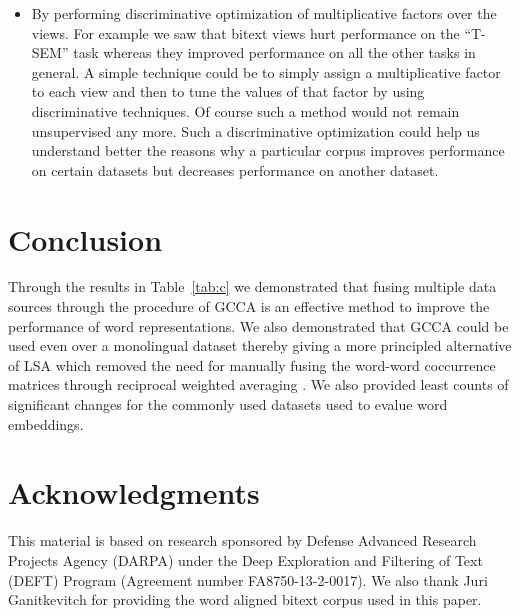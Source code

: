 \documentclass[11pt]{article}
\begin{document}
\begin{itemize}[leftmargin=*]
\item By performing discriminative optimization of multiplicative
  factors over the views. For example we saw that bitext views hurt
  performance on the ``T-SEM'' task whereas they improved performance
  on all the other tasks in general. A simple technique could be to
  simply assign a multiplicative factor to each view and 
  then to tune the values of that factor by using discriminative
  techniques. Of course such a method would not remain unsupervised any
  more. Such a discriminative optimization could help us understand
  better the reasons why a particular corpus improves performance on
  certain datasets but decreases performance on another dataset. %
\end{itemize}

\section{Conclusion}
Through the results in Table~\ref{tab:c} we demonstrated that fusing
multiple data sources through the procedure of GCCA is an effective
method to improve the performance of word representations. We also
demonstrated that GCCA could be used even over a monolingual dataset
thereby giving a more principled alternative of LSA which removed the
need for manually fusing the word-word coccurrence matrices through
reciprocal weighted averaging \cite{pennington2014glove}. We also
provided least counts of significant changes for the commonly used
datasets used to evalue word embeddings. 

\section*{Acknowledgments}
This material is based on research sponsored by Defense Advanced Research
Projects Agency (DARPA) under the Deep Exploration and
Filtering of Text (DEFT) Program (Agreement number
FA8750-13-2-0017). We also thank Juri Ganitkevitch for 
providing the word aligned bitext corpus used in this paper.



\end{document}
